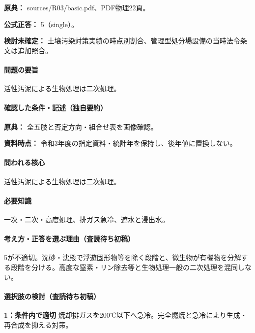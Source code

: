 \noindent\textbf{原典：} sources/R03/basic.pdf、PDF物理22頁。

\textbf{公式正答：} 5（single）。

\par\textbf{検討未確定：} 土壌汚染対策実績の時点別割合、管理型処分場設備の当時法令条文は追加照合。

\paragraph{問題の要旨} 活性汚泥による生物処理は二次処理。

\paragraph{確認した条件・記述（独自要約）}\mbox{}\par

\noindent\textbf{原典：} 全五肢と否定方向・組合せ表を画像確認。\par

\noindent\textbf{資料時点：} 令和3年度の指定資料・統計年を保持し、後年値に置換しない。\par

\paragraph{問われる核心} 活性汚泥による生物処理は二次処理。

\paragraph{必要知識} 一次・二次・高度処理、排ガス急冷、遮水と浸出水。

\paragraph{考え方・正答を選ぶ理由（査読待ち初稿）} 5が不適切。沈砂・沈殿で浮遊固形物等を除く段階と、微生物が有機物を分解する段階を分ける。高度な窒素・リン除去等と生物処理一般の二次処理を混同しない。

\paragraph{選択肢の検討（査読待ち初稿）}\mbox{}\par

\noindent\textbf{1：条件内で適切} 焼却排ガスを200℃以下へ急冷。完全燃焼と急冷により生成・再合成を抑える対策。\par

